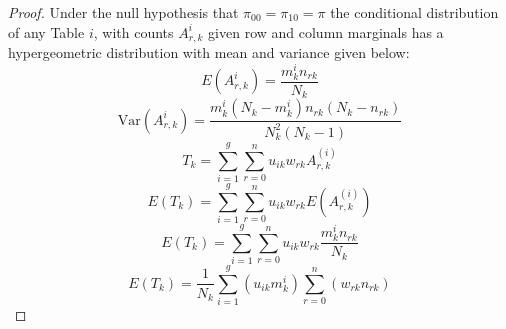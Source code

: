 \documentclass[12pt,oneside]{report}
\theoremstyle{definition}
\theoremstyle{mystyle}
\begin{document}
\begin{proof}
	Under the null hypothesis that $\pi_{00}=\pi_{10}=\pi$ the conditional distribution of any Table $i$, with counts $A_{r,k}^{i}$ given row and column marginals has a hypergeometric distribution with mean and variance given below:\\
	\begin{equation*}
	E(A_{r,k}^{i})=\frac{m_{k}^{i}n_{rk}}{N_{k}}
	\end{equation*}
	\vspace{4mm}
		\begin{equation*}
	\text{Var}(A_{r,k}^{i})=\displaystyle \frac{m_{k}^{i}(N_{k}-m_{k}^{i})n_{rk}(N_{k}-n_{rk})}{N^{2}_{k}(N_{k}-1)}
		\end{equation*}
	\vspace{4mm}
		\begin{equation*}
		T_{k}=\displaystyle\sum\limits_{i=1}^{g}\sum\limits_{r=0}^{n}u_{ik}w_{rk}A_{r,k}^{(i)}
		\end{equation*}
	\vspace{4mm}
		\begin{equation*}
		E(T_{k})=\displaystyle\sum\limits_{i=1}^{g}\sum\limits_{r=0}^{n}u_{ik}w_{rk}E(A_{r,k}^{(i)})
		\end{equation*}
	\vspace{4mm}
	\begin{equation*}
	E(T_{k})=\displaystyle\sum\limits_{i=1}^{g}\sum\limits_{r=0}^{n}u_{ik}w_{rk}\frac{m_{k}^{i}n_{rk}}{N_{k}}
	\end{equation*}
	\vspace{4mm}
	\begin{equation*}
	E(T_{k})=\displaystyle\frac{1}{N_{k}}\sum\limits_{i=1}^{g}\left(u_{ik}m_{k}^{i}\right)\sum\limits_{r=0}^{n}\left(w_{rk}n_{rk} \right)
	\end{equation*}

\end{proof}
\end{document}
